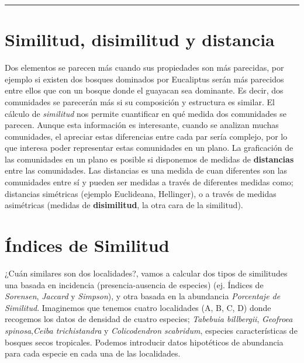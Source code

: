 \documentclass[]{book}
\begin{document}
\begin{center}\rule{0.5\linewidth}{\linethickness}\end{center}

\chapter{Similitud, disimilitud y
distancia}\label{similitud-disimilitud-y-distancia}

Dos elementos se parecen más cuando sus propiedades son más parecidas,
por ejemplo si existen dos bosques dominados por Eucaliptus serán más
parecidos entre ellos que con un bosque donde el guayacan sea dominante.
Es decir, dos comunidades se parecerán más si su composición y
estructura es similar. El cálculo de \emph{similitud} nos permite
cuantificar en qué medida dos comunidades se parecen. Aunque esta
información es interesante, cuando se analizan muchas comunidades, el
apreciar estas diferencias entre cada par sería complejo, por lo que
interesa poder representar estas comunidades en un plano. La graficación
de las comunidades en un plano es posible si disponemos de medidas de
\textbf{distancias} entre las comunidades. Las distancias es una medida
de cuan diferentes son las comunidades entre sí y pueden ser medidas a
través de diferentes medidas como; distancias simétricas (ejemplo
Euclideana, Hellinger), o a través de medidas asimétricas (medidas de
\textbf{disimilitud}, la otra cara de la similitud).

\chapter{Índices de Similitud}\label{indices-de-similitud}

¿Cuán similares son dos localidades?, vamos a calcular dos tipos de
similitudes una basada en incidencia (presencia-ausencia de especies)
(ej. Índices de \emph{Sorensen}, \emph{Jaccard} y \emph{Simpson}), y
otra basada en la abundancia \emph{Porcentaje de Similitud}. Imaginemos
que tenemos cuatro localidades (A, B, C, D) donde recogemos los datos de
densidad de cuatro especies; \emph{Tabebuia billbergii}, \emph{Geofroea
spinosa},\emph{Ceiba trichistandra} y \emph{Colicodendron scabridum},
especies características de bosques secos tropicales. Podemos introducir
datos hipotéticos de abundancia para cada especie en cada una de las
localidades.
\end{document}
